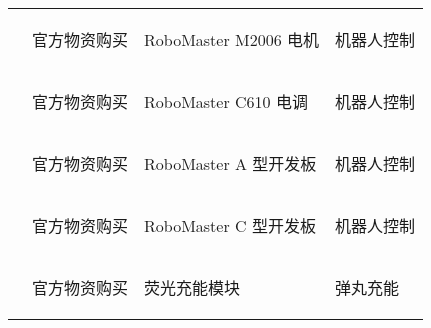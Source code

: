 \begin{longtable}{ X | X | X | X }
    \cline{2-4}

         &
        \begin{center}
            官方物资购买
        \end{center}&
        \begin{center}
            RoboMaster M2006 电机
        \end{center}&
        \begin{center}
            机器人控制
        \end{center}\\

    \cline{2-4}

         &
        \begin{center}
            官方物资购买
        \end{center}&
        \begin{center}
            RoboMaster C610 电调
        \end{center}&
        \begin{center}
            机器人控制
        \end{center}\\

    \cline{2-4}

         &
        \begin{center}
            官方物资购买
        \end{center}&
        \begin{center}
           RoboMaster A 型开发板
        \end{center}&
        \begin{center}
            机器人控制
        \end{center}\\

    \cline{2-4}

         &
        \begin{center}
            官方物资购买
        \end{center}&
        \begin{center}
            RoboMaster C 型开发板
        \end{center}&
        \begin{center}
            机器人控制
        \end{center}\\

    \cline{2-4}

         &
        \begin{center}
            官方物资购买
        \end{center}&
        \begin{center}
            荧光充能模块
        \end{center}&
        \begin{center}
            弹丸充能
        \end{center}\\


\end{longtable}
